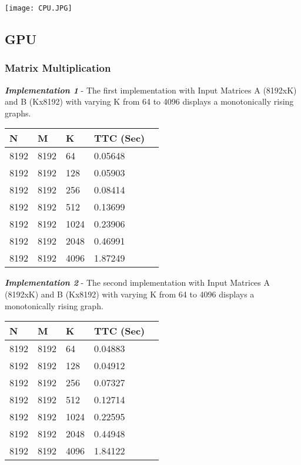 \documentclass[14pt,fleqn]{article}
\begin{document}
\begin{center}
\texttt{[image: CPU.JPG]}
\end{center}

\subsection{GPU}
\subsubsection{Matrix Multiplication}
\textit{\textbf{Implementation 1}} - The first implementation with Input Matrices A (8192xK) and B (Kx8192) with varying K from 64 to 4096 displays a monotonically rising graphs.\\

\begin{center}
\begin{tabular}{|l|l|l|l|l|}                                   
    \hline\hline         
    N  & M & K & TTC (Sec) \\
    \hline\hline
    8192 & 8192 & 64 & 0.05648 \\ \hline
    8192 & 8192 & 128 & 0.05903 \\ \hline
    8192 & 8192 & 256 & 0.08414 \\ \hline
    8192 & 8192 & 512 & 0.13699 \\ \hline
    8192 & 8192 & 1024 & 0.23906 \\ \hline
    8192 & 8192 & 2048 & 0.46991 \\ \hline
    8192 & 8192 & 4096 & 1.87249 \\ \hline

\end{tabular}
\end{center}

\textit{\textbf{Implementation 2}} - The second implementation with Input Matrices A (8192xK) and B (Kx8192) with varying K from 64 to 4096 displays a monotonically rising graph.\\

\begin{center}
\begin{tabular}{|l|l|l|l|l|}                                   
    \hline\hline         
    N  & M & K & TTC (Sec) \\
    \hline\hline
    8192 & 8192 & 64 & 0.04883 \\ \hline
    8192 & 8192 & 128 & 0.04912 \\ \hline
    8192 & 8192 & 256 & 0.07327 \\ \hline
    8192 & 8192 & 512 & 0.12714 \\ \hline
    8192 & 8192 & 1024 & 0.22595 \\ \hline
    8192 & 8192 & 2048 & 0.44948 \\ \hline
    8192 & 8192 & 4096 & 1.84122 \\ \hline

\end{tabular}
\end{center}
\end{document}
